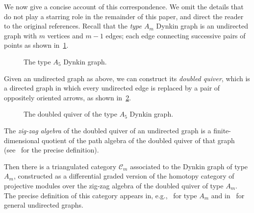 \documentclass{amsart}
\theoremstyle{definition}
\begin{document}
We now give a concise account of this correspondence.
We omit the details that do not play a starring role in the remainder of this paper, and direct the reader to the original references.
Recall that the \emph{type \(A_m\)} Dynkin graph is an undirected graph with \(m\) vertices and \(m-1\) edges; each edge connecting successive pairs of points as shown in~\cref{fig:a5-dynkin}.
\begin{figure}[h]
  \centering
  \caption{The type \(A_5\) Dynkin graph.}
  \label{fig:a5-dynkin}
\end{figure}
Given an undirected graph as above, we can construct its \emph{doubled quiver}, which is a directed graph in which every undirected edge is replaced by a pair of oppositely oriented arrows, as shown in~\cref{fig:a5-doubled}.
\begin{figure}[h]
  \centering
  \caption{The doubled quiver of the type \(A_5\) Dynkin graph.}
  \label{fig:a5-doubled}
\end{figure}
The \emph{zig-zag algebra} of the doubled quiver of an undirected graph is a finite-dimensional quotient of the path algebra of the doubled quiver of that graph (see~\cite[Section 3]{hue.kho:01} for the precise definition).

Then there is a triangulated category \(\mathcal{C}_m\) associated to the Dynkin graph of type \(A_m\), constructed as a differential graded version of the homotopy category of projective modules over the zig-zag algebra of the doubled quiver of type \(A_m\).
The precise definition of this category appears in, e.g.,~\cite{sei.tho:01,tho:06} for type \(A_m\) and in~\cite{bap.deo.lic:20} for general undirected graphs.
\end{document}
